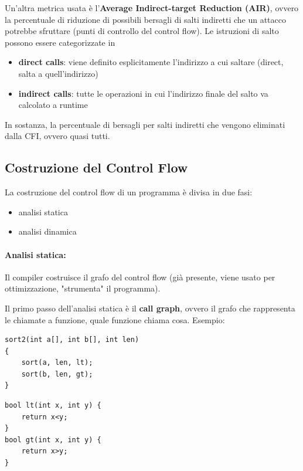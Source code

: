 Un'altra metrica usata è l'\textbf{Average Indirect-target Reduction (AIR)}, ovvero la percentuale di riduzione di possibili bersagli di salti indiretti che un attacco potrebbe sfruttare (punti di controllo del control flow). Le istruzioni di salto possono essere categorizzate in 
\begin{itemize}
	\item \textbf{direct calls}: viene definito esplicitamente l'indirizzo a cui saltare (direct, salta a quell'indirizzo)
	\item \textbf{indirect calls}: tutte le operazioni in cui l'indirizzo finale del salto va calcolato a runtime
\end{itemize}

In sostanza, la percentuale di bersagli per salti indiretti che vengono eliminati dalla CFI, ovvero quasi tutti.

\subsection{Costruzione del Control Flow}

La costruzione del control flow di un programma è divisa in due fasi: 
\begin{itemize}
	\item analisi statica
	\item analisi dinamica
\end{itemize}

\paragraph{Analisi statica:} Il compiler costruisce il grafo del control flow (già presente, viene usato per ottimizzazione, "strumenta" il programma). 

Il primo passo dell'analisi statica è il \textbf{call graph}, ovvero il grafo che rappresenta le chiamate a funzione, quale funzione chiama cosa. Esempio: 

\begin{center}
	\begin{minipage}[h]{0.52\textwidth}
		\begin{verbatim}
sort2(int a[], int b[], int len)
{
	sort(a, len, lt);
	sort(b, len, gt);
}
		\end{verbatim}
	\end{minipage}
	\begin{minipage}[h]{0.37\textwidth}
		\begin{verbatim}
bool lt(int x, int y) {
	return x<y;
}
bool gt(int x, int y) {
	return x>y;
}
		\end{verbatim}
	\end{minipage}
\end{center}

